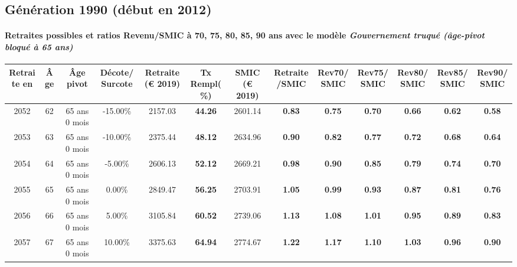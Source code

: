\newpage 
 
\subsection{Génération 1990 (début en 2012)} 

\paragraph{Retraites possibles et ratios Revenu/SMIC à 70, 75, 80, 85, 90 ans avec le modèle \emph{Gouvernement truqué (âge-pivot bloqué à 65 ans)}}  
 
{ \scriptsize \begin{center} 
\begin{tabular}[htb]{|c|c||c|c||c|c||c||c|c|c|c|c|c|} 
\hline 
 Retraite en &  Âge &  Âge pivot &  Décote/Surcote &  Retraite (\euro{} 2019) &  Tx Rempl(\%) &  SMIC (\euro{} 2019) &  Retraite/SMIC &  Rev70/SMIC &  Rev75/SMIC &  Rev80/SMIC &  Rev85/SMIC &  Rev90/SMIC \\ 
\hline \hline 
 2052 &  62 &  65 ans 0 mois &  -15.00\% &  2157.03 &  {\bf 44.26} &  2601.14 &  {\bf {\color{red} 0.83}} &  {\bf {\color{red} 0.75}} &  {\bf {\color{red} 0.70}} &  {\bf {\color{red} 0.66}} &  {\bf {\color{red} 0.62}} &  {\bf {\color{red} 0.58}} \\ 
\hline 
 2053 &  63 &  65 ans 0 mois &  -10.00\% &  2375.44 &  {\bf 48.12} &  2634.96 &  {\bf {\color{red} 0.90}} &  {\bf {\color{red} 0.82}} &  {\bf {\color{red} 0.77}} &  {\bf {\color{red} 0.72}} &  {\bf {\color{red} 0.68}} &  {\bf {\color{red} 0.64}} \\ 
\hline 
 2054 &  64 &  65 ans 0 mois &  -5.00\% &  2606.13 &  {\bf 52.12} &  2669.21 &  {\bf {\color{red} 0.98}} &  {\bf {\color{red} 0.90}} &  {\bf {\color{red} 0.85}} &  {\bf {\color{red} 0.79}} &  {\bf {\color{red} 0.74}} &  {\bf {\color{red} 0.70}} \\ 
\hline 
 2055 &  65 &  65 ans 0 mois &  0.00\% &  2849.47 &  {\bf 56.25} &  2703.91 &  {\bf 1.05} &  {\bf {\color{red} 0.99}} &  {\bf {\color{red} 0.93}} &  {\bf {\color{red} 0.87}} &  {\bf {\color{red} 0.81}} &  {\bf {\color{red} 0.76}} \\ 
\hline 
 2056 &  66 &  65 ans 0 mois &  5.00\% &  3105.84 &  {\bf 60.52} &  2739.06 &  {\bf 1.13} &  {\bf 1.08} &  {\bf 1.01} &  {\bf {\color{red} 0.95}} &  {\bf {\color{red} 0.89}} &  {\bf {\color{red} 0.83}} \\ 
\hline 
 2057 &  67 &  65 ans 0 mois &  10.00\% &  3375.63 &  {\bf 64.94} &  2774.67 &  {\bf 1.22} &  {\bf 1.17} &  {\bf 1.10} &  {\bf 1.03} &  {\bf {\color{red} 0.96}} &  {\bf {\color{red} 0.90}} \\ 
\hline 
\hline 
\end{tabular} 
\end{center} } 
